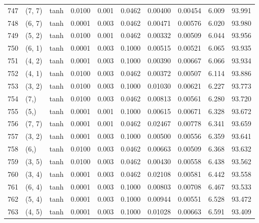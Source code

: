 \begin{tabular}{lllrrrrrrr}
747 &      (7, 7) &      tanh &  0.0100 &  0.001 &  0.0462 &          0.00400 &    0.00454 &       6.009 &    93.991 \\
748 &      (6, 7) &      tanh &  0.0001 &  0.003 &  0.0462 &          0.00471 &    0.00576 &       6.020 &    93.980 \\
749 &      (5, 2) &      tanh &  0.0100 &  0.001 &  0.0462 &          0.00332 &    0.00509 &       6.044 &    93.956 \\
750 &      (6, 1) &      tanh &  0.0001 &  0.003 &  0.1000 &          0.00515 &    0.00521 &       6.065 &    93.935 \\
751 &      (4, 2) &      tanh &  0.0001 &  0.003 &  0.1000 &          0.00390 &    0.00667 &       6.066 &    93.934 \\
752 &      (4, 1) &      tanh &  0.0100 &  0.003 &  0.0462 &          0.00372 &    0.00507 &       6.114 &    93.886 \\
753 &      (3, 2) &      tanh &  0.0100 &  0.003 &  0.1000 &          0.01030 &    0.00621 &       6.227 &    93.773 \\
754 &        (7,) &      tanh &  0.0100 &  0.003 &  0.0462 &          0.00813 &    0.00561 &       6.280 &    93.720 \\
755 &        (5,) &      tanh &  0.0001 &  0.001 &  0.1000 &          0.00615 &    0.00671 &       6.328 &    93.672 \\
756 &      (7, 7) &      tanh &  0.0001 &  0.001 &  0.0462 &          0.02467 &    0.00778 &       6.341 &    93.659 \\
757 &      (3, 2) &      tanh &  0.0001 &  0.003 &  0.1000 &          0.00500 &    0.00556 &       6.359 &    93.641 \\
758 &        (6,) &      tanh &  0.0100 &  0.003 &  0.0462 &          0.00663 &    0.00509 &       6.368 &    93.632 \\
759 &      (3, 5) &      tanh &  0.0100 &  0.003 &  0.0462 &          0.00430 &    0.00558 &       6.438 &    93.562 \\
760 &      (3, 4) &      tanh &  0.0001 &  0.003 &  0.0462 &          0.02108 &    0.00581 &       6.442 &    93.558 \\
761 &      (6, 4) &      tanh &  0.0001 &  0.003 &  0.1000 &          0.00803 &    0.00708 &       6.467 &    93.533 \\
762 &      (5, 4) &      tanh &  0.0001 &  0.003 &  0.1000 &          0.00944 &    0.00551 &       6.528 &    93.472 \\
763 &      (4, 5) &      tanh &  0.0001 &  0.003 &  0.1000 &          0.01028 &    0.00663 &       6.591 &    93.409 \\

\end{tabular}
